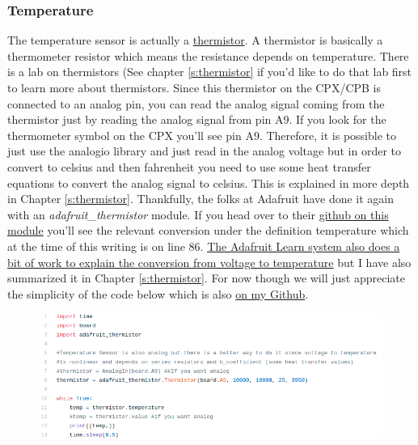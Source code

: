 {\subsubsection{Temperature}
The temperature sensor is actually
a \href{https://en.wikipedia.org/wiki/Thermistor}{thermistor}. A
thermistor is basically a thermometer resistor which means the
resistance depends on temperature. There is a lab on thermistors (See
chapter \ref{s:thermistor} if you'd like to do that lab first to learn more
about thermistors. Since this thermistor on the CPX/CPB is connected to an analog pin, you can read the analog signal coming from the thermistor just by reading the analog signal from pin A9. If you look for the thermometer symbol on the CPX
you’ll see pin A9. Therefore, it is possible to just use the analogio
library and just read in the analog voltage but in order to convert to
celsius and then fahrenheit you need to use some heat transfer
equations to convert the analog signal to celsius. This is explained in more depth in Chapter \ref{s:thermistor}. Thankfully, the
folks at Adafruit have done it again with an {\it
adafruit\_thermistor} module. If you head over to
their \href{https://github.com/adafruit/Adafruit_CircuitPython_Thermistor/blob/master/adafruit_thermistor.py}{github
on this module} you’ll see the relevant conversion under the
definition temperature which at the time of this writing is on line
86. \href{https://learn.adafruit.com/thermistor/circuitpython}{The
Adafruit Learn system also does a bit of work to explain the
conversion from voltage to temperature} but I have also summarized it in Chapter \ref{s:thermistor}. For now though we will just
appreciate the simplicity of the code below which is
also \href{https://github.com/cmontalvo251/Microcontrollers/blob/master/Circuit_Playground/CircuitPython/Temp/record_temperature_thermistor.py}{on
my Github}. 
\begin{figure}[H]
  \begin{center}
    \includegraphics[width=\textwidth]{Figures/thermistor_code.png}
  \end{center}

\end{figure}}
